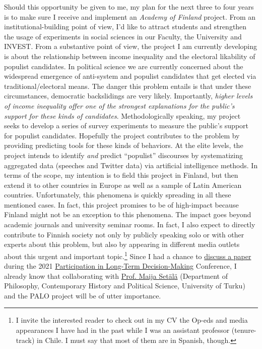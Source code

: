 \documentclass[10pt,stdletter,dateno,sigleft]{newlfm} %
\begin{document}
\begin{newlfm}
Should this opportunity be given to me, my plan for the next three to four years is to make sure I receive and implement an \emph{Academy of Finland} project. From an institutional-building point of view, I'd like to attract students and strengthen the usage of experiments in social sciences in our Faculty, the University and INVEST. From a substantive point of view, the project I am currently developing is about the relationship between income inequality and the electoral likability of populist candidates. In political science we are currently concerned about the widespread emergence of anti-system and populist candidates that get elected via traditional/electoral means. The danger this problem entails is that under these circumstances, democratic backslidings are very likely. Importantly, \emph{higher levels of income inequality offer one of the strongest explanations for the public's support for these kinds of candidates}. Methodologically speaking, my project seeks to develop a series of survey experiments to measure the public's support for populist candidates. Hopefully the project contributes to the problem by providing predicting tools for these kinds of behaviors. At the elite levels, the project intends to identify \emph{and} predict ``populist'' discourses by systematizing aggregated data (speeches and Twitter data) via artificial intelligence methods. In terms of the scope, my intention is to field this project in Finland, but then extend it to other countries in Europe as well as a sample of Latin American countries. Unfortunately, this phenomena is quickly spreading in all these mentioned cases. In fact, this project promises to be of high-impact because Finland might not be an exception to this phenomena. The impact goes beyond academic journals and university seminar rooms. In fact, I also expect to directly contribute to Finnish society not only by publicly speaking solo or with other experts about this problem, but also by appearing in different media outlets about this urgent and important topic.\footnote{I invite the interested reader to check out in my CV the Op-eds and media appearances I have had in the past while I was an assistant professor (tenure-track) in Chile. I must say that most of them are in Spanish, though.} Since I had a chance to \href{https://paloresearch.fi/en/events/}{discuss a paper} during the 2021 \href{https://paloresearch.fi/en/}{Participation in Long-Term Decision-Making} Conference, I already know that collaborating with \href{https://www.utu.fi/en/people/maija-setala}{Prof. Maija Set{\"a}l{\"a}} (Department of Philosophy, Contemporary History and Political Science, University of Turku) and the PALO project will be of utter importance. 


\end{newlfm}
\end{document}
